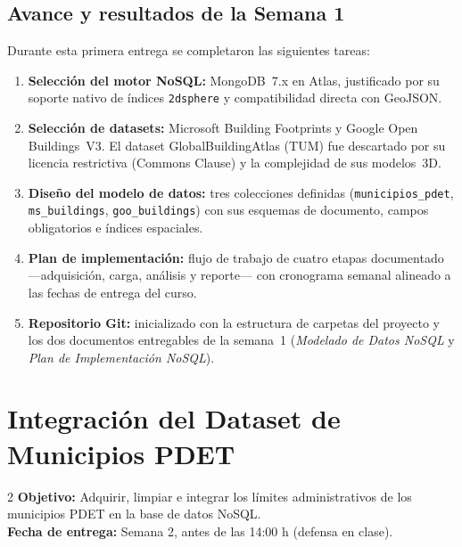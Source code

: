 \documentclass[12pt, a4paper]{report}
\begin{document}
\section{Avance y resultados de la Semana 1}

Durante esta primera entrega se completaron las siguientes tareas:

\begin{enumerate}[label=\textbf{\arabic*.}]
  \item \textbf{Selección del motor NoSQL:} MongoDB~7.x en Atlas, justificado por
        su soporte nativo de índices \texttt{2dsphere} y compatibilidad directa
        con GeoJSON.
  \item \textbf{Selección de datasets:} Microsoft Building Footprints y Google Open
        Buildings~V3. El dataset GlobalBuildingAtlas (TUM) fue descartado por su
        licencia restrictiva (Commons Clause) y la complejidad de sus modelos~3D.
  \item \textbf{Diseño del modelo de datos:} tres colecciones definidas
        (\texttt{municipios\_pdet}, \texttt{ms\_buildings}, \texttt{goo\_buildings})
        con sus esquemas de documento, campos obligatorios e índices espaciales.
  \item \textbf{Plan de implementación:} flujo de trabajo de cuatro etapas
        documentado —adquisición, carga, análisis y reporte— con cronograma semanal
        alineado a las fechas de entrega del curso.
  \item \textbf{Repositorio Git:} inicializado con la estructura de carpetas del
        proyecto y los dos documentos entregables de la semana~1
        (\textit{Modelado de Datos NoSQL} y \textit{Plan de Implementación NoSQL}).
\end{enumerate}

\chapter{Integración del Dataset de Municipios PDET}
\label{cap:entrega2}

\begin{semanabox}[Entrega 2]{2}
  \textbf{Objetivo:} Adquirir, limpiar e integrar los límites administrativos
  de los municipios PDET en la base de datos NoSQL.\\
  \textbf{Fecha de entrega:} Semana 2, antes de las 14:00 h (defensa en clase).
\end{semanabox}
\end{document}
